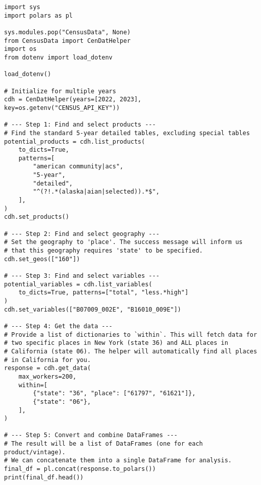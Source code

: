 \documentclass{article}
\begin{document}
\begin{verbatim}
import sys
import polars as pl

sys.modules.pop("CensusData", None)
from CensusData import CenDatHelper
import os
from dotenv import load_dotenv

load_dotenv()

# Initialize for multiple years
cdh = CenDatHelper(years=[2022, 2023], key=os.getenv("CENSUS_API_KEY"))

# --- Step 1: Find and select products ---
# Find the standard 5-year detailed tables, excluding special tables
potential_products = cdh.list_products(
    to_dicts=True,
    patterns=[
        "american community|acs",
        "5-year",
        "detailed",
        "^(?!.*(alaska|aian|selected)).*$",
    ],
)
cdh.set_products()

# --- Step 2: Find and select geography ---
# Set the geography to 'place'. The success message will inform us
# that this geography requires 'state' to be specified.
cdh.set_geos(["160"])

# --- Step 3: Find and select variables ---
potential_variables = cdh.list_variables(
    to_dicts=True, patterns=["total", "less.*high"]
)
cdh.set_variables(["B07009_002E", "B16010_009E"])

# --- Step 4: Get the data ---
# Provide a list of dictionaries to `within`. This will fetch data for
# two specific places in New York (state 36) and ALL places in
# California (state 06). The helper will automatically find all places
# in California for you.
response = cdh.get_data(
    max_workers=200,
    within=[
        {"state": "36", "place": ["61797", "61621"]},
        {"state": "06"},
    ],
)

# --- Step 5: Convert and combine DataFrames ---
# The result will be a list of DataFrames (one for each product/vintage).
# We can concatenate them into a single DataFrame for analysis.
final_df = pl.concat(response.to_polars())
print(final_df.head())
\end{verbatim}
\end{document}
